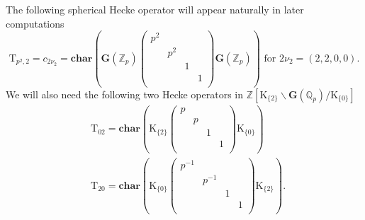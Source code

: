 \documentclass[10pt]{amsart}
\numberwithin{equation}{section}
\theoremstyle{definition}
\def\bfG{\mathbf{G}}
\def\QQ{\mathbb{Q}}
\def\ZZ{\mathbb{Z}}
\def\rmK{\mathrm{K}}
\def\rmT{\mathrm{T}}
\begin{document}
The following spherical Hecke operator will appear naturally in later computations
\begin{equation*}
\rmT_{p^{2},2}=c_{2\nu_{2}}=\mathbf{char}(\bfG(\ZZ_{p})\begin{pmatrix}p^{2}&&&\\&p^{2}&&\\&&1&\\&&&1\\\end{pmatrix}\bfG(\ZZ_{p})) \text{ for } 2\nu_{2}=(2, 2, 0, 0).
\end{equation*}
We will also need the following two Hecke operators in $\ZZ[\rmK_{\{2\}}\backslash \bfG(\QQ_{p})/\rmK_{\{0\}}]$
\begin{equation*}
\begin{aligned}
&\rmT_{02}= \mathbf{char}(\rmK_{\{2\}}\begin{pmatrix}p&&&\\&p&&\\&&1&\\&&&1\\\end{pmatrix}\rmK_{\{0\}})\\
&\rmT_{20}= \mathbf{char}(\rmK_{\{0\}}\begin{pmatrix}p^{-1}&&&\\&p^{-1}&&\\&&1&\\&&&1\\\end{pmatrix}\rmK_{\{2\}}).\\
\end{aligned}
\end{equation*}
\end{document}
